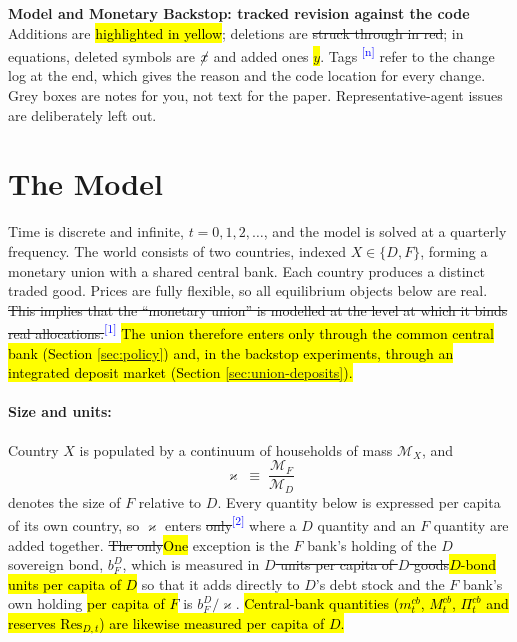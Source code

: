 \documentclass[11pt]{article}
\newcommand{\A}[1]{\hl{#1}}
\newcommand{\D}[1]{{\color{red}\st{#1}}}
\newcommand{\chg}[1]{\textsuperscript{\textcolor{blue}{\scriptsize[#1]}}}
\begin{document}
\begin{center}
{\Large\bfseries Model and Monetary Backstop: tracked revision against the code}\\[6pt]
{\small Additions are \hl{highlighted in yellow}; deletions are {\color{red}\st{struck through in red}}; in equations, deleted symbols are {\color{red}$\cancel{x}$} and added ones \colorbox{yellow}{$y$}.
Tags \chg{n} refer to the change log at the end, which gives the reason and the code location for every change.
Grey boxes are notes for you, not text for the paper. Representative-agent issues are deliberately left out.}
\end{center}

\setcounter{section}{1}
\section{The Model}
\label{sec:model}

Time is discrete and infinite, $t=0,1,2,\dots$, and the model is solved at a quarterly frequency. The world consists of two countries, indexed $X\in\{D,F\}$, forming a monetary union with a shared central bank. Each country produces a distinct traded good. Prices are fully flexible, so all equilibrium objects below are real. \D{This implies that the ``monetary union'' is modelled at the level at which it binds real allocations.}\chg{1} \A{The union therefore enters only through the common central bank (Section {\ref{sec:policy}}) and, in the backstop experiments, through an integrated deposit market (Section {\ref{sec:union-deposits}}).}

\paragraph{Size and units:}
Country $X$ is populated by a continuum of households of mass $\mathcal{M}_X$, and
\begin{equation}
\varkappa\;\equiv\;\frac{\mathcal{M}_F}{\mathcal{M}_D}
\label{eq:size-ratio}
\end{equation}
denotes the size of $F$ relative to $D$. Every quantity below is expressed per capita of its own country, so $\varkappa$ enters \D{only}\chg{2} where a $D$ quantity and an $F$ quantity are added together. \D{The only}\A{One} exception is the $F$ bank's holding of the $D$ sovereign bond, $b^{D}_{F}$, which is measured in \D{$D$ units per capita of $D$ goods}\A{$D$-bond units per capita of $D$} so that it adds directly to $D$'s debt stock and the $F$ bank's own holding \A{per capita of $F$} is $b^{D}_{F}/\varkappa$. \A{Central-bank quantities ($m^{cb}_t$, $M^{cb}_t$, $\Pi^{cb}_t$ and reserves $\mathrm{Res}_{D,t}$) are likewise measured per capita of $D$.}
\end{document}

